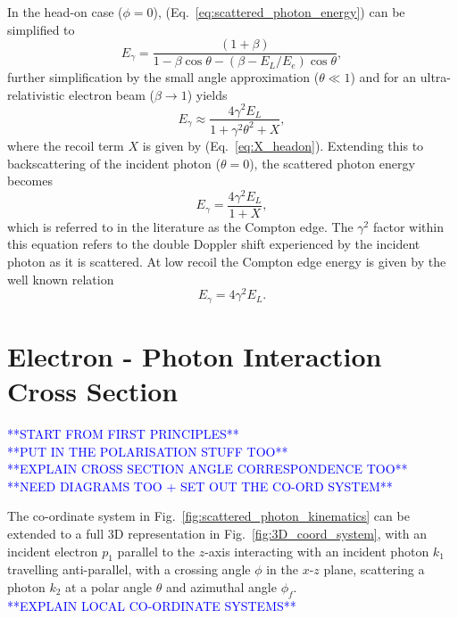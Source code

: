 \documentclass[../main.tex]{subfiles}
\begin{document}
In the head-on case ($\phi=0$), (Eq.~\ref{eq:scattered_photon_energy}) can be simplified to 
\begin{equation}
E_{\gamma} = \frac{\left(1+\beta\right)}{1-\beta\cos\theta-\left(\beta-E_{L}/E_{e}\right)\cos\theta},
\label{eq:headon_scattered_photon_energy}
\end{equation}
further simplification by the small angle approximation ($\theta \ll 1$) and for an ultra-relativistic electron beam ($\beta \rightarrow 1$) yields
\begin{equation}
E_{\gamma} \approx \frac{4\gamma^{2}E_{L}}{1+\gamma^{2}\theta^{2}+X},    
\label{eq:small_angle_scattered_photon_energy}
\end{equation}
where the recoil term $X$ is given by (Eq.~\ref{eq:X_headon}). Extending this to backscattering of the incident photon ($\theta = 0$), the scattered photon energy becomes
\begin{equation}
E_{\gamma} = \frac{4\gamma^{2}E_{L}}{1+X},
\label{eq:headon_backscattering_scattered_photon_energy}
\end{equation}
which is referred to in the literature \cite{krafft2010compton} as the Compton edge. The $\gamma^{2}$ factor within this equation refers to the double Doppler shift experienced by the incident photon as it is scattered. At low recoil the Compton edge energy is given by the well known relation
\begin{equation}
E_{\gamma} = 4\gamma^{2}E_{L}.
\label{eq:compton_edge_energy}    
\end{equation}

\section{Electron - Photon Interaction Cross Section}
\label{sec:electron_photon_interaction_cross_section}

\textcolor{blue}{**START FROM FIRST PRINCIPLES** \\ **PUT IN THE POLARISATION STUFF TOO**\\ **EXPLAIN CROSS SECTION ANGLE CORRESPONDENCE TOO** \\ **NEED DIAGRAMS TOO + SET OUT THE CO-ORD SYSTEM**}

The co-ordinate system in Fig.~\ref{fig:scattered_photon_kinematics} can be extended to a full 3D representation in Fig.~\ref{fig:3D_coord_system}, with an incident electron $p_{1}$ parallel to the $z$-axis interacting with an incident photon $k_{1}$ travelling anti-parallel, with a crossing angle $\phi$ in the $x$-$z$ plane, scattering a photon $k_{2}$ at a polar angle $\theta$ and azimuthal angle $\phi_{f}$.  
\textcolor{blue}{\\**EXPLAIN LOCAL CO-ORDINATE SYSTEMS**}
\end{document}
